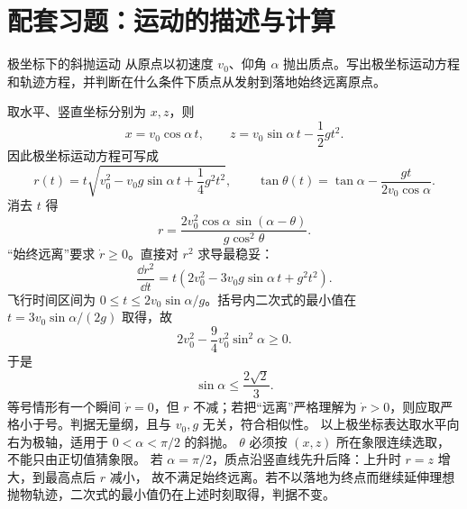\clearpage
\section{配套习题：运动的描述与计算}
\label{r2ch01:sec:practice-motion}

\begin{practicebox}{极坐标下的斜抛运动}
从原点以初速度 $v_0$、仰角 $\alpha$ 抛出质点。写出极坐标运动方程和轨迹方程，并判断在什么条件下质点从发射到落地始终远离原点。
\label{r2ch01:pr:001}
\begin{solution}
取水平、竖直坐标分别为 $x,z$，则
\[
  x=v_0\cos\alpha\,t,\qquad
  z=v_0\sin\alpha\,t-\frac12gt^2.
\]
因此极坐标运动方程可写成
\[
  r(t)=t\sqrt{v_0^2-v_0g\sin\alpha\,t+\frac14g^2t^2},\qquad
  \tan\theta(t)=\tan\alpha-\frac{gt}{2v_0\cos\alpha}.
\]
消去 $t$ 得
\[
  \boxed{r=\frac{2v_0^2\cos\alpha\,\sin(\alpha-\theta)}{g\cos^2\theta}}.
\]
“始终远离”要求 $\dot r\geq0$。直接对 $r^2$ 求导最稳妥：
\[
  \frac{\dd r^2}{\dd t}
  =t\left(2v_0^2-3v_0g\sin\alpha\,t+g^2t^2\right).
\]
飞行时间区间为 $0\leq t\leq2v_0\sin\alpha/g$。括号内二次式的最小值在
$t=3v_0\sin\alpha/(2g)$ 取得，故
\[
  2v_0^2-\frac94v_0^2\sin^2\alpha\geq0.
\]
于是
\[
  \boxed{\sin\alpha\leq\frac{2\sqrt2}{3}}.
\]
等号情形有一个瞬间 $\dot r=0$，但 $r$ 不减；若把“远离”严格理解为 $\dot r>0$，则应取严格小于号。判据无量纲，且与 $v_0,g$ 无关，符合相似性。
以上极坐标表达取水平向右为极轴，适用于 $0<\alpha<\pi/2$ 的斜抛。
$\theta$ 必须按 $(x,z)$ 所在象限连续选取，不能只由正切值猜象限。
若 $\alpha=\pi/2$，质点沿竖直线先升后降：上升时 $r=z$ 增大，到最高点后 $r$ 减小，
故不满足始终远离。若不以落地为终点而继续延伸理想抛物轨迹，二次式的最小值仍在上述时刻取得，判据不变。
\end{solution}
\end{practicebox}

